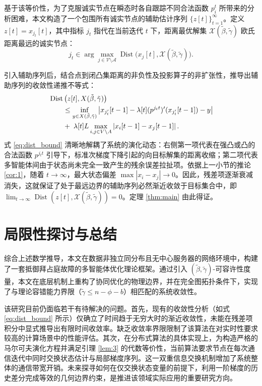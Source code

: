 基于该等价性，为了克服诚实节点在瞬态时各自跟踪不同合法函数 $p_i^t$ 所带来的分析困难，本文构造了一个包围所有诚实节点的辅助估计序列 $\{z[t]\}_{t=1}^\infty$。定义 $z[t] = x_{j_t}[t]$，其中指标 $j_t$ 指代在当前迭代 $t$ 下，距离最优解集 $\mathcal{X}(\tilde{\beta}, \tilde{\gamma})$ 欧氏距离最远的诚实节点：
\begin{equation}
    j_t \in \arg \max_{j \in \mathcal{V} \setminus \mathcal{A}} \operatorname{Dist}\Big(x_j[t], \mathcal{X}(\tilde{\beta}, \tilde{\gamma})\Big).
\end{equation}

引入辅助序列后，结合点到闭凸集距离的非负性及投影算子的非扩张性，推导出辅助序列的收敛性递推不等式：
\begin{align}
    & \operatorname{Dist} \left( z[t], X(\tilde{\beta}, \tilde{\gamma}) \right)  \notag \\
    & \qquad \leq \inf_{y \in X(\tilde{\beta}, \tilde{\gamma})} \left| x_{j'_t} [t - 1] - \lambda[t] (p^{j_t t})' (x_{j'_t} [t - 1]) - y \right|\notag \\
    & \qquad + \; \lambda[t] L \max_{i,j \in V \setminus A} \left| x_i [t - 1] - x_j [t - 1] \right|. \label{eq:dist_bound}
\end{align}
式 \eqref{eq:dist_bound} 清晰地解耦了系统的演化动态：右侧第一项代表在强凸或凸的合法函数 $p^{j_t t}$ 引导下，标准次梯度下降引起的向目标解集的距离收缩；第二项代表多智能体间由于状态尚未完全一致产生的残余误差拉扯项。依据上一小节的推论 \ref{cor:1}，随着 $t \to \infty$，最大状态偏差 $\max |x_i - x_j| \to 0$。因此，残差项逐渐衰减消失，这就保证了处于最远边界的辅助序列必然渐近收敛于目标集合中，即 $\lim_{t \to \infty} \operatorname{Dist}(z[t], \mathcal{X}(\tilde{\beta}, \tilde{\gamma})) = 0$。定理 \ref{thm:main} 由此得证。

\section{局限性探讨与总结}

\quad \quad  综合上述数学推导，本文在数据非独立同分布且无中心服务器的网络环境中，构建了一套抵御拜占庭故障的多智能体优化理论框架。通过引入 $(\tilde{\beta}, \tilde{\gamma})$-可容许性度量，本文在底层机制上重构了协同优化的物理边界，并在完全图拓扑条件下，实现了与理论容错能力界限（$\tilde{\gamma} \le n-\phi-b$）相匹配的系统收敛性。

该研究目前仍面临若干有待解决的问题。首先，现有的收敛性分析（如式 \ref{eq:dist_bound} 所示）仅确立了时间趋于无穷大时的渐近收敛性，未能在残差项积分中显式推导出有限时间收敛率。缺乏收敛率界限限制了该算法在对实时性要求较高的计算场景中的性能评估。其次，在分布式算法的具体实现上，为构造严格的马尔可夫演化方程并满足引理 \ref{lem:3} 的代数等价性，当前算法要求节点在每次通信迭代中同时交换状态估计与局部梯度序列。这一双重信息交换机制增加了系统整体的通信带宽开销。未来探寻如何在仅交换状态变量的前提下，利用一阶梯度的历史差分完成等效的几何边界约束，是推进该领域实际应用的重要研究方向。
